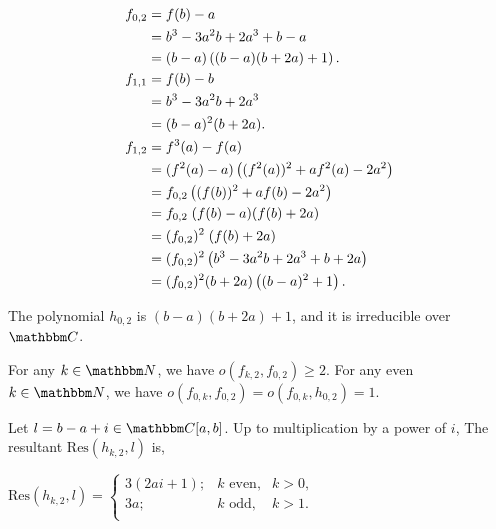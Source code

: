 \documentclass[10pt,a4paper]{amsart}
\newcommand{\C}{{\mathbbm C}}
\newcommand{\N}{{\mathbbm N}}
\begin{document}
        \begin{align}
            f_{0,2} & =f(b)-a \notag\\
            & = b^{3} -3a^{2}b+2a^{3}+b-a \notag\\
            & = (b-a)\left((b-a)(b+2a)+1\right). \label{h023.}\\
            f_{1,1} & =f(b)-b \notag \\
            & =b^{3}-3a^{2}b+2a^{3}\notag \\
            & =(b-a)^{2}(b+2a).\label{f113}\\
            f_{1,2} & =f^{3}(a)-f(a)\notag \\
            & =(f^{2}(a)-a)\left((f^{2}(a))^{2}+af^{2}(a)-2a^{2}\right)\notag \\
            & = f_{0,2} \left((f(b))^{2}+af(b)-2a^{2}\right)\notag \\
            & = f_{0,2}\; (f(b)-a)(f(b)+2a)\notag \\
            & = (f_{0,2})^{2} \;(f(b)+2a)\label{f123byf023}\\
            & = (f_{0,2})^{2}\left(b^{3}-3a^{2}b+2a^{3}+b+2a \right)\notag \\
            & = (f_{0,2})^{2} (b+2a)\left((b-a)^{2}+1\right).\label{f123}
        \end{align}

    \begin{lemma}\label{h023}
        The polynomial $h_{0,2}$ is $(b-a)(b+2a)+1$, and it is irreducible over $\C$.
    \end{lemma}

    \begin{lemma}\label{divlemma}
        For any $k\in \N$, we have $o(f_{k,2},f_{0,2})\geq 2$. For any even $k\in \N$, we have $o(f_{0,k},f_{0,2})=o(f_{0,k},h_{0,2})=1$.
    \end{lemma}

    \begin{lemma}\label{k23res}
        Let $l=b-a+i \in \C[a,b]$. Up to multiplication by a power of $i$, The resultant $\mbox{Res}(h_{k,2},l)$ is,
        \begin{center}
            $\mbox{Res}(h_{k,2},l)= \left\{ \begin{array}{rcl}
                3(2ai+1); & k \mbox{ even,} & k>0, \\ 3a; & k \mbox{ odd,} & k>1. \\
            \end{array}\right.$
        \end{center}
    \end{lemma}
\end{document}
